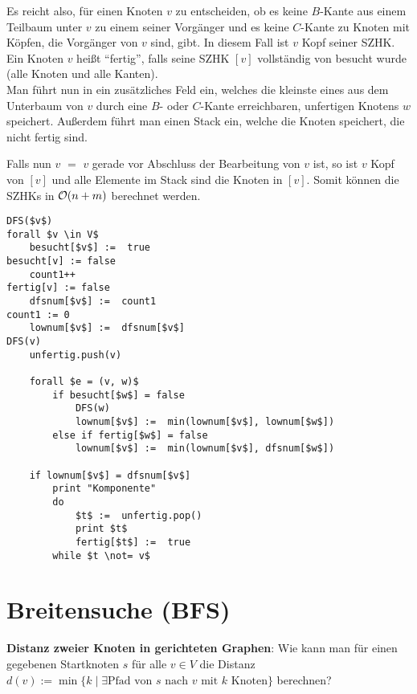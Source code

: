 \linie

Es reicht also, für einen Knoten $v$ zu entscheiden, ob es keine $B$-Kante
aus einem Teilbaum unter $v$ zu einem seiner Vorgänger und es keine $C$-Kante
zu Knoten mit Köpfen, die Vorgänger von $v$ sind, gibt.
In diesem Fall ist $v$ Kopf seiner SZHK. \\
Ein Knoten $v$ heißt "`fertig"', falls seine SZHK $[v]$ vollständig von
 besucht wurde (alle Knoten und alle Kanten). \\
Man führt nun in  ein zusätzliches Feld  ein, welches
die kleinste  eines aus dem Unterbaum von $v$ durch eine
$B$- oder $C$-Kante erreichbaren, unfertigen Knotens $w$ speichert.
Außerdem führt man einen Stack  ein, welche die Knoten
speichert, die nicht fertig sind.

Falls nun \code{dfsnum[}$v$\code{]} $=$ \code{lownum[}$v$\code{]} gerade
vor Abschluss der Bearbeitung von $v$\code{)} ist,
so ist $v$ Kopf von $[v]$ und alle Elemente im Stack  sind
die Knoten in $[v]$.
Somit können die SZHKs in $\mathcal{O}(n + m)$ berechnet werden.

\begin{lstlisting}
DFS($v$)                                                                  forall $v \in V$
    besucht[$v$] :=  true                                                      besucht[v] := false
    count1++                                                               fertig[v] := false
    dfsnum[$v$] :=  count1                                                     count1 := 0
    lownum[$v$] :=  dfsnum[$v$]                                                   DFS(v)
    unfertig.push(v)

    forall $e = (v, w)$
        if besucht[$w$] = false
            DFS(w)
            lownum[$v$] :=  min(lownum[$v$], lownum[$w$])
        else if fertig[$w$] = false
            lownum[$v$] :=  min(lownum[$v$], dfsnum[$w$])

    if lownum[$v$] = dfsnum[$v$]
        print "Komponente"
        do
            $t$ :=  unfertig.pop()
            print $t$
            fertig[$t$] :=  true
        while $t \not= v$
\end{lstlisting}

\section{%
    Breitensuche (BFS)%
}

\textbf{Distanz zweier Knoten in gerichteten Graphen}:
Wie kann man für einen gegebenen Startknoten $s$ für alle $v \in V$ die
Distanz $d(v) := \min\{k \;|\; \exists\text{Pfad von } s \text{ nach } v
\text{ mit } k \text{ Knoten}\}$ berechnen?

